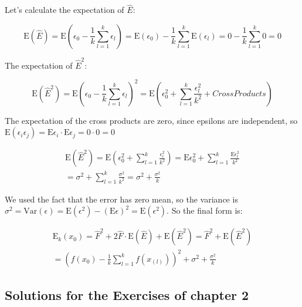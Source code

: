\documentclass{article}
\begin{document}
Let's calculate the expectation of $\hat{E}$:

\begin{equation}
    \text{E} (\hat{E}) = \text{E} \left( \epsilon_0 - \frac 1k \sum_{l=1}^{k}\epsilon_l \right) = \text{E} (\epsilon_0) - \frac 1k \sum_{l=1}^{k}\text{E} (\epsilon_l) = 0 - \frac 1k \sum_{l=1}^{k}0 = 0
\end{equation}

The expectation of $\hat{E}^2$:

\begin{equation}
    \text{E} (\hat{E}^2) = \text{E} \left( \epsilon_0 - \frac 1k \sum_{l=1}^{k}\epsilon_l \right)^2 = \text{E} \left( \epsilon_0^2 + \sum_{l=1}^{k}\frac{\epsilon_l^2}{k^2} + CrossProducts \right)
\end{equation}

The expectation of the cross products are zero, since epsilons are independent, so $\text{E}(\epsilon_i \epsilon_j) = \text{E} \epsilon_i \cdot \text{E} \epsilon_j = 0\cdot 0 = 0$

\begin{equation}
  \begin{split}
    \text{E} (\hat{E}^2) = \text{E} \left( \epsilon_0^2 + \sum_{l=1}^{k}\frac{\epsilon_l^2}{k^2} \right) = \text{E} \epsilon_0^2 + \sum_{l=1}^{k}\frac{\text{E}\epsilon_l^2}{k^2}\\
    = \sigma^2 + \sum_{l=1}^{k}\frac{\sigma^2}{k^2} = \sigma^2 + \frac{\sigma^2}{k}
  \end{split}
\end{equation}

We used the fact that the error has zero mean, so the variance is $\sigma^2 = \text{Var}(\epsilon) = \text{E}(\epsilon^2) - (\text{E}\epsilon)^2 = \text{E}(\epsilon^2)$. So the final form is:

\begin{equation}
  \begin{split}
    \text{E}_k(x_0) = \hat{F}^2 + 2\hat{F}\cdot\text{E}(\hat{E}) + \text{E}(\hat{E}^2) = \hat{F}^2 + \text{E}(\hat{E}^2)\\
    = \left( f(x_0) - \frac 1k \sum_{l=1}^{k}f(x_{(l)}) \right)^2 + \sigma^2 + \frac{\sigma^2}{k}
  \end{split}
\end{equation}

\subsection{Solutions for the Exercises of chapter 2}
\end{document}
